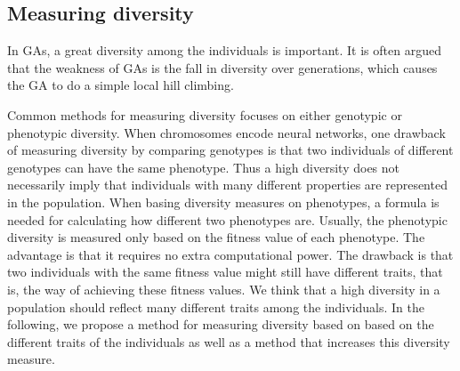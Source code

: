 
\subsection{Measuring diversity}
In GAs, a great diversity among the individuals is important.
It is often argued that the weakness of GAs is the fall in diversity over generations, which causes the GA to do a simple local hill climbing.

Common methods for measuring diversity focuses on either genotypic or phenotypic diversity.
When chromosomes encode neural networks, one drawback of measuring diversity by comparing genotypes is that two individuals of different genotypes can have the same phenotype. Thus a high diversity does not necessarily imply that individuals with many different properties are represented in the population.
When basing diversity measures on phenotypes, a formula is needed for calculating how different two phenotypes are. 
Usually, the phenotypic diversity is measured only based on the fitness value of each phenotype.
The advantage is that it requires no extra computational power. 
The drawback is that two individuals with the same fitness value might still have different traits, that is, the way of achieving these fitness values. We think that a high diversity in a population should reflect many different traits among the individuals. In the following, we propose a method for measuring diversity based on based on the different traits of the individuals as well as a method that increases this diversity measure. 

